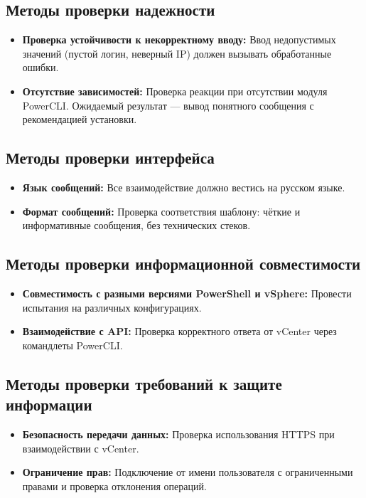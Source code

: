 \subsection{Методы проверки надежности}

\begin{itemize}
    \item \textbf{Проверка устойчивости к некорректному вводу:} Ввод недопустимых значений (пустой логин, неверный IP) должен вызывать обработанные ошибки.
    \item \textbf{Отсутствие зависимостей:} Проверка реакции при отсутствии модуля PowerCLI. Ожидаемый результат — вывод понятного сообщения с рекомендацией установки.
\end{itemize}

\subsection{Методы проверки интерфейса}

\begin{itemize}
    \item \textbf{Язык сообщений:} Все взаимодействие должно вестись на русском языке.
    \item \textbf{Формат сообщений:} Проверка соответствия шаблону: чёткие и информативные сообщения, без технических стеков.
\end{itemize}

\subsection{Методы проверки информационной совместимости}

\begin{itemize}
    \item \textbf{Совместимость с разными версиями PowerShell и vSphere:} Провести испытания на различных конфигурациях.
    \item \textbf{Взаимодействие с API:} Проверка корректного ответа от vCenter через командлеты PowerCLI.
\end{itemize}

\subsection{Методы проверки требований к защите информации}

\begin{itemize}
    \item \textbf{Безопасность передачи данных:} Проверка использования HTTPS при взаимодействии с vCenter.
    \item \textbf{Ограничение прав:} Подключение от имени пользователя с ограниченными правами и проверка отклонения операций.
\end{itemize}

